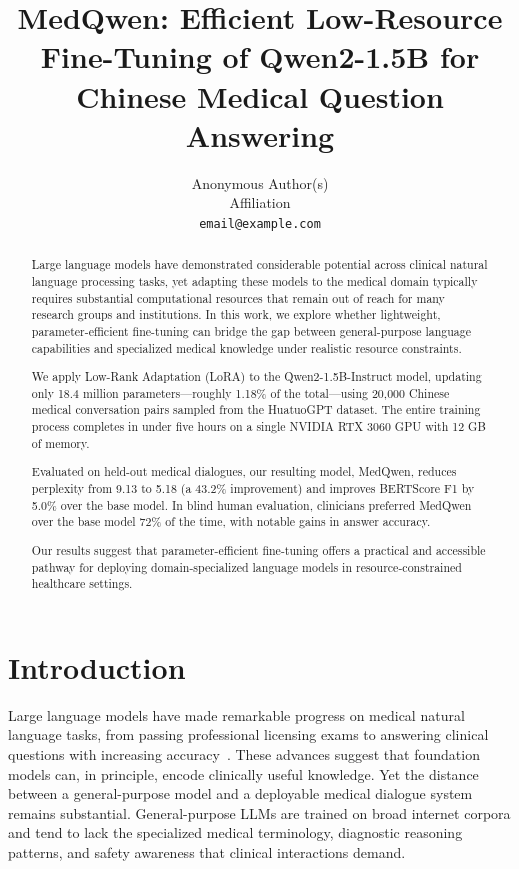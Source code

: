 \documentclass[11pt,a4paper]{article}
\title{MedQwen: Efficient Low-Resource Fine-Tuning of \newline
       Qwen2-1.5B for Chinese Medical Question Answering}
\author{
  Anonymous Author(s) \\
  Affiliation \\
  \texttt{email@example.com}
}
\begin{document}
\maketitle

\begin{abstract}

Large language models have demonstrated considerable potential across clinical natural language processing tasks, yet adapting these models to the medical domain typically requires substantial computational resources that remain out of reach for many research groups and institutions. In this work, we explore whether lightweight, parameter-efficient fine-tuning can bridge the gap between general-purpose language capabilities and specialized medical knowledge under realistic resource constraints.

We apply Low-Rank Adaptation (LoRA) to the Qwen2-1.5B-Instruct model, updating only 18.4 million parameters---roughly 1.18\% of the total---using 20,000 Chinese medical conversation pairs sampled from the HuatuoGPT dataset. The entire training process completes in under five hours on a single NVIDIA RTX 3060 GPU with 12 GB of memory.

Evaluated on held-out medical dialogues, our resulting model, MedQwen, reduces perplexity from 9.13 to 5.18 (a 43.2\% improvement) and improves BERTScore F1 by 5.0\% over the base model. In blind human evaluation, clinicians preferred MedQwen over the base model 72\% of the time, with notable gains in answer accuracy.

Our results suggest that parameter-efficient fine-tuning offers a practical and accessible pathway for deploying domain-specialized language models in resource-constrained healthcare settings.

\end{abstract}

\section{Introduction}

Large language models have made remarkable progress on medical natural language tasks, from passing professional licensing exams to answering clinical questions with increasing accuracy~\cite{singhal2023medpalm, nori2023gpt4}. These advances suggest that foundation models can, in principle, encode clinically useful knowledge. Yet the distance between a general-purpose model and a deployable medical dialogue system remains substantial. General-purpose LLMs are trained on broad internet corpora and tend to lack the specialized medical terminology, diagnostic reasoning patterns, and safety awareness that clinical interactions demand.
\end{document}
